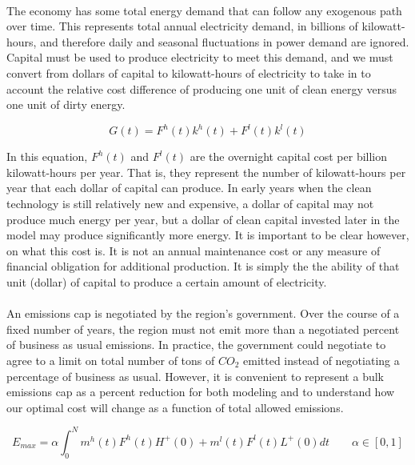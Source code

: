 \documentclass{easychithesis}
\begin{document}
\paragraph{} The economy has some total energy demand that can follow any exogenous path over time. This represents total annual electricity demand, in billions of kilowatt-hours, and therefore daily and seasonal fluctuations in power demand are ignored. Capital must be used to produce electricity to meet this demand, and we must convert from dollars of capital to kilowatt-hours of electricity to take in to account the relative cost difference of producing one unit of clean energy versus one unit of dirty energy. 

\begin{equation}\label{eq:simpleGenConstraint}
G(t) = F^h(t) k^h(t) + F^l(t) k^l(t)
\end{equation}

In this equation, $F^h (t)$ and $F^l (t)$ are the overnight capital cost per billion kilowatt-hours per year. That is, they represent the number of kilowatt-hours per year that each dollar of capital can produce. In early years when the clean technology is still relatively new and expensive, a dollar of capital may not produce much energy per year, but a dollar of clean capital invested later in the model may produce significantly more energy. It is important to be clear however, on what this cost is. It is not an annual maintenance cost or any measure of financial obligation for additional production. It is simply the the ability of that unit (dollar) of capital to produce a certain amount of electricity. 


\paragraph{} An emissions cap is negotiated by the region's government. Over the course of a fixed number of years, the region must not emit more than a negotiated percent of business as usual emissions. In practice, the government could negotiate to agree to a limit on total number of tons of $CO_2$ emitted instead of negotiating a percentage of business as usual. However, it is convenient to represent a bulk emissions cap as a percent reduction for both modeling and to understand how our optimal cost will change as a function of total allowed emissions.

\begin{equation}\label{eq:simpleMaxEmission}
E_{max} = \alpha \int_0^N m^h(t) F^h(t) H^+(0) + m^l(t) F^l(t) L^+(0) dt \qquad \alpha \in [0,1]
\end{equation}
\end{document}
